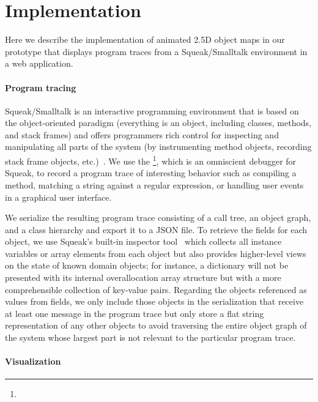 \section{Implementation}
\label{sec:implementation}

Here we describe the implementation of animated 2.5D object maps in our prototype \tfd{} that displays program traces from a Squeak/Smalltalk environment in a web application.

\paragraph{Program tracing}
\label{sec:implementation/program_tracing}

Squeak/Smalltalk is an interactive programming environment that is based on the object-oriented paradigm (everything is an object, including classes, methods, and stack frames) and offers programmers rich control for inspecting and manipulating all parts of the system (by instrumenting method objects, recording stack frame objects, etc.)~\cite{ingalls1997back,rowledge2001tour,thiede2023squeak}.
We use the \tdb{}\footnote{}, which is an omniscient debugger for Squeak, to record a program trace of interesting behavior such as compiling a method, matching a string against a regular expression, or handling user events in a graphical user interface.

We serialize the resulting program trace consisting of a call tree, an object graph, and a class hierarchy and export it to a JSON file.
To retrieve the fields for each object, we use Squeak's built-in inspector tool~\cite[chap. 6, sec. 3]{thiede2023squeak} which collects all instance variables or array elements from each object but also provides higher-level views on the state of known domain objects; for instance, a dictionary will not be presented with its internal overallocation array structure but with a more comprehensible collection of key-value pairs.
Regarding the objects referenced as values from fields, we only include those objects in the serialization that receive at least one message in the program trace but only store a flat string representation of any other objects to avoid traversing the entire object graph of the system whose largest part is not relevant to the particular program trace.

\paragraph{Visualization}
\label{sec:implementation/visualization}

